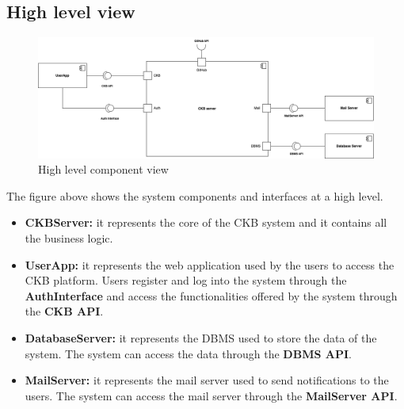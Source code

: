 \subsection{High level view}
\begin{figure}[H]
    \centering
    \includegraphics[width=\textwidth]{images/component_view/Component_view.png}
    \caption{High level component view}
\end{figure}
The figure above shows the system components and interfaces at a high level.
\begin{itemize}
    \item \textbf{CKBServer: } it represents the core of the CKB system and it contains all the business logic.
    \item \textbf{UserApp: } it represents the web application used by the users to access the CKB platform. Users register and log into the system through the 
    \textbf{AuthInterface} and access the functionalities offered by the system through the \textbf{CKB API}.
    \item \textbf{DatabaseServer: } it represents the DBMS used to store the data of the system. The system can access the data through the \textbf{DBMS API}.
    \item \textbf{MailServer: } it represents the mail server used to send notifications to the users. The system can access the mail server through the \textbf{MailServer API}.
\end{itemize}

